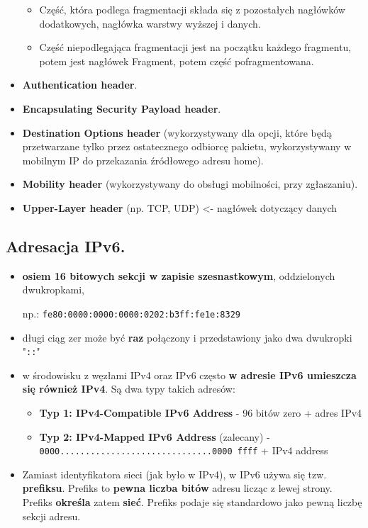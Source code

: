 \documentclass[../main.tex]{subfiles}
\begin{document}
\begin{itemize}
\begin{itemize}
            \item Część, która podlega fragmentacji składa się z pozostałych nagłówków dodatkowych, nagłówka warstwy wyższej i danych.
            \item Część niepodlegająca fragmentacji jest na początku każdego fragmentu, potem jest nagłówek Fragment, potem część pofragmentowana.
        \end{itemize}
        \item \textbf{Authentication header}.
        \item \textbf{Encapsulating Security Payload header}.
        \item \textbf{Destination Options header} (wykorzystywany dla opcji, które będą przetwarzane tylko przez ostatecznego odbiorcę pakietu, wykorzystywany w mobilnym IP do przekazania źródłowego adresu home).
        \item \textbf{Mobility header} (wykorzystywany do obsługi mobilności, przy zgłaszaniu).
        \item \textbf{Upper-Layer header} (np. TCP, UDP) <- nagłówek dotyczący danych
    \end{itemize}

    \subsection{Adresacja IPv6.}
    \begin{itemize}
        \item \textbf{osiem 16 bitowych sekcji w zapisie szesnastkowym}, oddzielonych dwukropkami,

        np.: \texttt{fe80:0000:0000:0000:0202:b3ff:fe1e:8329}
        \item długi ciąg zer może być \textbf{raz} połączony i przedstawiony jako dwa dwukropki "\texttt{::}"
        \item w środowisku z węzłami IPv4 oraz IPv6 często \textbf{w adresie IPv6 umieszcza się również IPv4}. Są dwa typy takich adresów:
        \begin{itemize}
            \item \textbf{Typ 1: IPv4-Compatible IPv6 Address} - 96 bitów zero + adres IPv4
            \item \textbf{Typ 2: IPv4-Mapped IPv6 Address} (zalecany) -\\
            \texttt{0000..............................0000 ffff} + IPv4 address
        \end{itemize}
        \item Zamiast identyfikatora sieci (jak było w IPv4), w IPv6 używa się tzw. \textbf{prefiksu}. Prefiks to \textbf{pewna liczba bitów} adresu licząc z lewej strony. Prefiks \textbf{określa} zatem \textbf{sieć}. Prefiks podaje się standardowo jako pewną liczbę sekcji adresu.
    \end{itemize}
\end{document}
